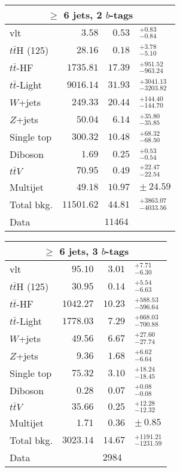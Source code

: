 \documentclass{article}[11pt,a4paper]
\begin{document}
\small


\renewcommand{\arraystretch}{1.3}
\begin{tabular}{lr@{ $\pm$ }r@{ }l}
\multicolumn{4}{c}{$\geq$ 6 jets, 2 $b$-tags}\\
\hline\hline
vlt & $3.58$ & $0.53$& $^{+0.83}_{-0.84}$\\
\hline
$t\bar{t}$H (125) & $28.16$ & $0.18$& $^{+3.78}_{-5.10}$\\
$t\bar{t}$-HF & $1735.81$ & $17.39$& $^{+951.52}_{-963.24}$\\
$t\bar{t}$-Light & $9016.14$ & $31.93$& $^{+3041.13}_{-3203.82}$\\
$W$+jets & $249.33$ & $20.44$& $^{+144.40}_{-144.70}$\\
$Z$+jets & $50.04$ & $6.14$& $^{+35.80}_{-35.85}$\\
Single top & $300.32$ & $10.48$& $^{+68.32}_{-68.50}$\\
Diboson & $1.69$ & $0.25$& $^{+0.53}_{-0.54}$\\
$t\bar{t}$$V$ & $70.95$ & $0.49$& $^{+22.47}_{-22.54}$\\
Multijet & $49.18$ & $10.97$& $ \pm\ 24.59$\\
\hline
Total bkg. & $11501.62$ & $44.81$ & $^{+3863.07}_{-4033.56}$\\
\hline
Data & \multicolumn{3}{c}{$11464$} \\
\hline\hline
\end{tabular}
\vspace{0.5cm}


\renewcommand{\arraystretch}{1.3}
\begin{tabular}{lr@{ $\pm$ }r@{ }l}
\multicolumn{4}{c}{$\geq$ 6 jets, 3 $b$-tags}\\
\hline\hline
vlt & $95.10$ & $3.01$& $^{+7.71}_{-6.30}$\\
\hline
$t\bar{t}$H (125) & $30.95$ & $0.14$& $^{+5.54}_{-6.63}$\\
$t\bar{t}$-HF & $1042.27$ & $10.23$& $^{+588.53}_{-596.64}$\\
$t\bar{t}$-Light & $1778.03$ & $7.29$& $^{+668.03}_{-700.88}$\\
$W$+jets & $49.56$ & $6.67$& $^{+27.60}_{-27.74}$\\
$Z$+jets & $9.36$ & $1.68$& $^{+6.62}_{-6.64}$\\
Single top & $75.32$ & $3.10$& $^{+18.24}_{-18.45}$\\
Diboson & $0.28$ & $0.07$& $^{+0.08}_{-0.08}$\\
$t\bar{t}$$V$ & $35.66$ & $0.25$& $^{+12.28}_{-12.32}$\\
Multijet & $1.71$ & $0.36$& $ \pm\ 0.85$\\
\hline
Total bkg. & $3023.14$ & $14.67$ & $^{+1191.21}_{-1231.59}$\\
\hline
Data & \multicolumn{3}{c}{$2984$} \\
\hline\hline
\end{tabular}
\vspace{0.5cm}
\end{document}

